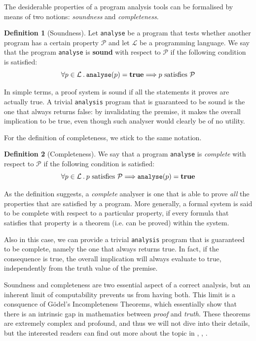\documentclass[12pt,a4paper]{book}
\newcommand{\st}{\hspace{2px}.\hspace{2px}}
\theoremstyle{definition}
\newtheorem{defn}{Definition}
\begin{document}
	The desiderable properties of a program analysis tools can be formalised by means of two notions: \textit{soundness} and \textit{completeness}.
	
	\begin{defn}[Soundness]
		Let \texttt{analyse} be a program that tests whether another program has a certain property $\mathcal{P}$ and let $\mathcal{L}$ be a programming language. We say that the program \texttt{analyse} is \textbf{sound} with respect to $\mathcal{P}$ if the following condition is satisfied:
		\[
		\forall p \in \mathcal{L} \st \text{\texttt{analyse}}(p) = \text{\textbf{true}} \Longrightarrow p \text{ satisfies } \mathcal{P}
		\]
	\end{defn}
	In simple terms, a proof system is sound if all the statements it proves are actually true. A trivial \texttt{analysis} program that is guaranteed to be sound is the one that always returns false: by invalidating the premise, it makes the overall implication to be true, even though such analyser would clearly be of no utility.
	
	For the definition of completeness, we stick to the same notation.
	\begin{defn}[Completeness]
		We say that a program \texttt{analyse} is \textit{complete} with respect to $\mathcal{P}$ if the following condition is satisfied:
		\[
		\forall p \in \mathcal{L} \st p \text{ satisfies } \mathcal{P} \Longrightarrow \text{\texttt{analyse}}(p) = \text{\textbf{true}} 
		\]
	\end{defn}
	As the definition suggests, a \textit{complete} analyser is one that is able to prove \textit{all} the properties that are satisfied by a program. More generally, a formal system is said to be complete with respect to a particular property, if every formula that satisfies that property is a theorem (i.e. can be proved) within the system.
	
	Also in this case, we can provide a trivial \texttt{analysis} program that is guaranteed to be complete, namely the one that always returns true. In fact, if the consequence is true, the overall implication will always evaluate to true, independently from the truth value of the premise.
	
	Soundness and completeness are two essential aspect of a correct analysis, but an inherent limit of computability prevents us from having both. This limit is a consquence of Gödel's Incompleteness Theorems, which essentially show that there is an intrinsic gap in mathematics between \textit{proof} and \textit{truth}. These theorems are extremely complex and profound, and thus we will not dive into their details, but the interested readers can find out more about the topic in \cite{Odifreddi1989}, \cite{Rogers1987}, \cite{Hinman2007}.
\end{document}
